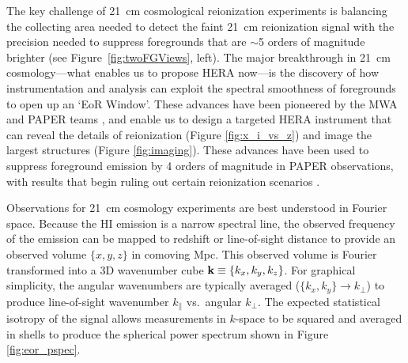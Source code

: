\documentclass[preprint]{aastex}
\def\kperp{k_{\bot}}
\def\kpar{k_{\|}}
\def\kperp{k_{\bot}}
\def\kpar{k_{\|}}
\def\k{{\bf k}}
\def\HI{{H{\small I }}}
\begin{document}
The key challenge of 21~cm cosmological reionization experiments is 
balancing the collecting area needed to detect the faint 21~cm reionization signal
with the precision needed to suppress
foregrounds that are $\sim$5 orders of magnitude brighter (see Figure~\ref{fig:twoFGViews}, left).
The major breakthrough in 21~cm cosmology---what enables us to propose HERA now---is 
the discovery of how 
instrumentation and analysis can exploit the 
spectral smoothness of foregrounds
to open up an `EoR Window'.  These advances have been pioneered by the MWA and PAPER teams \citep{morales_et_al2012,parsons_et_al2012b,vedantham_2012,Datta_2010,hazelton_et_al2013,pober_et_al2013,parsons_et_al2013,dillon_et_al2013b}, and enable us to design a targeted HERA instrument that can reveal the details of reionization (Figure \ref{fig:x_i_vs_z}) and image the largest structures (Figure \ref{fig:imaging}).
These advances have been used to suppress foreground emission by 4
orders of magnitude in PAPER observations,
with results that begin ruling out certain reionization scenarios
\citep{parsons_et_al2013}.

Observations for 21~cm cosmology experiments are best understood in
Fourier space.  Because the \HI emission is a
narrow spectral line, the observed frequency of the emission can be mapped to
redshift or line-of-sight distance to provide an observed volume $\{x,y,z\}$ in
comoving Mpc. This observed volume is Fourier transformed into a 3D
wavenumber cube $\k\equiv\{k_{x}, k_{y}, k_{z}\}$. For graphical simplicity, the angular
wavenumbers are typically averaged ($\{k_{x},k_{y}\}\rightarrow\kperp$) to
produce line-of-sight wavenumber $\kpar$ vs.\ angular $\kperp$. 
The expected statistical isotropy of the signal allows measurements in $k$-space to be
squared and averaged in shells to produce the spherical power spectrum
shown in Figure \ref{fig:eor_pspec}.
\end{document}
